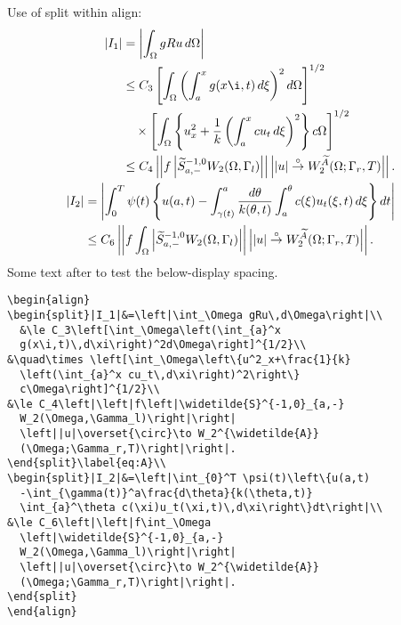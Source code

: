 \documentclass[draft]{amsart}
\newcommand{\ntt}{\normalfont\ttfamily}
\newcommand{\env}[1]{{\protect\ntt#1}}
\theoremstyle{definition}
\theoremstyle{remark}
\begin{document}

\newpage
Use of \env{split} within \env{align}:
{
\begin{align}
\begin{split}|I_1|&=\left|\int_\Omega gRu\,d\Omega\right|\\
  &\le C_3\left[\int_\Omega\left(\int_{a}^x
  g(x\i,t)\,d\xi\right)^2d\Omega\right]^{1/2}\\
&\quad\times \left[\int_\Omega\left\{u^2_x+\frac{1}{k}
  \left(\int_{a}^x cu_t\,d\xi\right)^2\right\}
  c\Omega\right]^{1/2}\\
&\le C_4\left|\left|f\left|\widetilde{S}^{-1,0}_{a,-}
  W_2(\Omega,\Gamma_l)\right|\right|
  \left||u|\overset{\circ}\to W_2^{\widetilde{A}}
  (\Omega;\Gamma_r,T)\right|\right|.
\end{split}\label{eq:A}\\
\begin{split}|I_2|&=\left|\int_{0}^T \psi(t)\left\{u(a,t)
  -\int_{\gamma(t)}^a\frac{d\theta}{k(\theta,t)}
  \int_{a}^\theta c(\xi)u_t(\xi,t)\,d\xi\right\}dt\right|\\
&\le C_6\left|\left|f\int_\Omega
 \left|\widetilde{S}^{-1,0}_{a,-}
  W_2(\Omega,\Gamma_l)\right|\right|
  \left||u|\overset{\circ}\to W_2^{\widetilde{A}}
  (\Omega;\Gamma_r,T)\right|\right|.
\end{split}
\end{align}}%
Some text after to test the below-display spacing.

\begin{verbatim}
\begin{align}
\begin{split}|I_1|&=\left|\int_\Omega gRu\,d\Omega\right|\\
  &\le C_3\left[\int_\Omega\left(\int_{a}^x
  g(x\i,t)\,d\xi\right)^2d\Omega\right]^{1/2}\\
&\quad\times \left[\int_\Omega\left\{u^2_x+\frac{1}{k}
  \left(\int_{a}^x cu_t\,d\xi\right)^2\right\}
  c\Omega\right]^{1/2}\\
&\le C_4\left|\left|f\left|\widetilde{S}^{-1,0}_{a,-}
  W_2(\Omega,\Gamma_l)\right|\right|
  \left||u|\overset{\circ}\to W_2^{\widetilde{A}}
  (\Omega;\Gamma_r,T)\right|\right|.
\end{split}\label{eq:A}\\
\begin{split}|I_2|&=\left|\int_{0}^T \psi(t)\left\{u(a,t)
  -\int_{\gamma(t)}^a\frac{d\theta}{k(\theta,t)}
  \int_{a}^\theta c(\xi)u_t(\xi,t)\,d\xi\right\}dt\right|\\
&\le C_6\left|\left|f\int_\Omega
  \left|\widetilde{S}^{-1,0}_{a,-}
  W_2(\Omega,\Gamma_l)\right|\right|
  \left||u|\overset{\circ}\to W_2^{\widetilde{A}}
  (\Omega;\Gamma_r,T)\right|\right|.
\end{split}
\end{align}
\end{verbatim}
\end{document}
